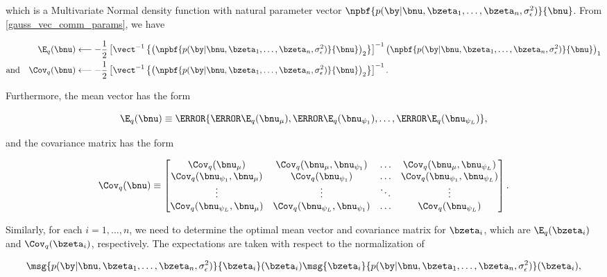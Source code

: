 \documentclass[12pt]{article}
\def\sigsqeps{\sigma^2_{\epsilon}}
\def\numu{\bnu_\mu}
\newcommand\nupsi[1]{\bnu_{\psi_{#1}}}
\theoremstyle{plain}
\theoremstyle{definition}
\theoremstyle{remark}
\begin{document}
\noindent which is a Multivariate Normal density function with natural parameter vector $\npbf{p (\by | \bnu, \bzeta_1,
\dots, \bzeta_n, \sigsqeps)}{\bnu}$. From \eqref{gauss_vec_comm_params}, we have

\begin{align}
\begin{split}
	\E_q (\bnu)
		&\longleftarrow
			-\frac12 \left[
				\vect^{-1} \left\{
					\left( \npbf{p (\by | \bnu, \bzeta_1, \dots, \bzeta_n, \sigsqeps)}{\bnu} \right)_2
				\right\}
			\right]^{-1} \left( \npbf{p (\by | \bnu, \bzeta_1, \dots, \bzeta_n, \sigsqeps)}{\bnu} \right)_1 \\
	\text{and} \quad
	\Cov_q (\bnu)
		&\longleftarrow
			-\frac12 \left[
				\vect^{-1} \left\{
					\left( \npbf{p (\by | \bnu, \bzeta_1, \dots, \bzeta_n, \sigsqeps)}{\bnu} \right)_2
				\right\}
			\right]^{-1}.
\end{split}
\label{mom_lik_nu}
\end{align}

\noindent Furthermore, the mean vector has the form

\begin{equation}
	\E_q (\bnu) \equiv \T{
		\left\{ \T{\E_q (\numu)}, \T{\E_q (\nupsi{1})}, \dots, \T{\E_q (\nupsi{L})} \right\}
	},
\label{exp_lik_nu}
\end{equation}

\noindent and the covariance matrix has the form

\begin{equation}
	\Cov_q (\bnu) \equiv \begin{bmatrix}
		\Cov_q (\numu) & \Cov_q (\numu, \nupsi{1}) & \dots & \Cov_q (\numu, \nupsi{L}) \\
		\Cov_q (\nupsi{1}, \numu) & \Cov_q (\nupsi{1}) & \dots & \Cov_q (\nupsi{1}, \nupsi{L}) \\
		\vdots & \vdots & \ddots & \vdots \\
		\Cov_q (\nupsi{L}, \numu) & \Cov_q (\nupsi{L}, \nupsi{1}) & \dots & \Cov_q (\nupsi{L}) \\
	\end{bmatrix}.
\label{cov_lik_nu}
\end{equation}

\noindent Similarly, for each $i = 1, \dots, n$, we need to determine the optimal mean vector and covariance matrix
for $\bzeta_i$, which are $\E_q (\bzeta_i)$ and $\Cov_q (\bzeta_i)$, respectively. The expectations are taken with
respect to the normalization of

\[
	\msg{p (\by | \bnu, \bzeta_1, \dots, \bzeta_n, \sigsqeps)}{\bzeta_i} (\bzeta_i)
	\msg{\bzeta_i}{p (\by | \bnu, \bzeta_1, \dots, \bzeta_n, \sigsqeps)} (\bzeta_i),
\]
\end{document}
